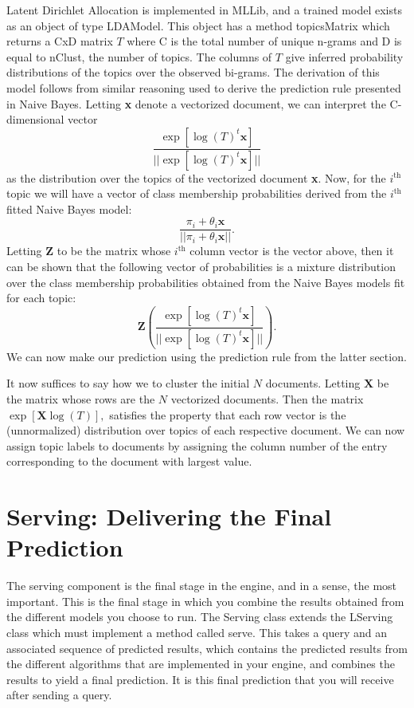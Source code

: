 \documentclass[a4paper,12pt]{article}
\renewcommand{\bf}[1]{\textbf{#1}}
\newcommand{\3}{\left}
\newcommand{\4}{\right}
\renewcommand{\-}[1]{{}^{-#1}}
\begin{document}
Latent Dirichlet Allocation is implemented in MLLib, and a trained model exists as an object of type LDAModel. This object has a method topicsMatrix which returns a CxD matrix $T$ where C is the total number of unique n-grams and D is equal to nClust, the number of topics. The columns of $T$ give inferred probability distributions of the topics over the observed bi-grams. The derivation of this model follows from similar reasoning used to derive the prediction rule presented in Naive Bayes. Letting \bf{x} denote a vectorized document, we can interpret the C-dimensional vector 
$$
\frac{\exp\3[\log(T)^t\bf{x}\4]}{||\exp\3[\log(T)^t\bf{x}\4]||}
$$ 
as the distribution over the topics of the vectorized document \bf{x}. Now, for the $i^\text{th}$ topic we will have a vector of class membership probabilities derived from the $i^\text{th}$ fitted Naive Bayes model:
$$
\frac{\pi_i + \theta_i\bf{x}}{||\pi_i + \theta_i\bf{x}||}.
$$
Letting $\bf{Z}$ to be the matrix whose $i^\text{th}$ column vector is the vector above, then it can be shown that the following vector of probabilities is a mixture distribution over the class membership probabilities obtained from the Naive Bayes models fit for each topic:
$$
\bf{Z}\3(\frac{\exp\3[\log(T)^t\bf{x}\4]}{||\exp\3[\log(T)^t\bf{x}\4]||}\4).
$$
We can now make our prediction using the prediction rule from the latter section.

It now suffices to say how we to cluster the initial $N$ documents. Letting $\bf{X}$ be the matrix whose rows are the $N$ vectorized documents. Then the matrix $\exp\3[\bf{X} \log(T)\4],$ satisfies the property that each row vector is the (unnormalized) distribution over topics of each respective document. We can now assign topic labels to documents by assigning the column number of the entry corresponding to the document with largest value.

\section*{Serving: Delivering the Final Prediction}

The serving component is the final stage in the engine, and in a sense, the most important. This is the final stage in which you combine the results obtained from the different models you choose to run. The Serving class extends the LServing
 class which must implement a method called serve. This takes a query and an associated sequence of predicted results, which contains the predicted results from the different algorithms that are implemented in your engine, and combines the results to yield a final prediction.  It is this final prediction that you will receive after sending a query. 
 
\end{document}
